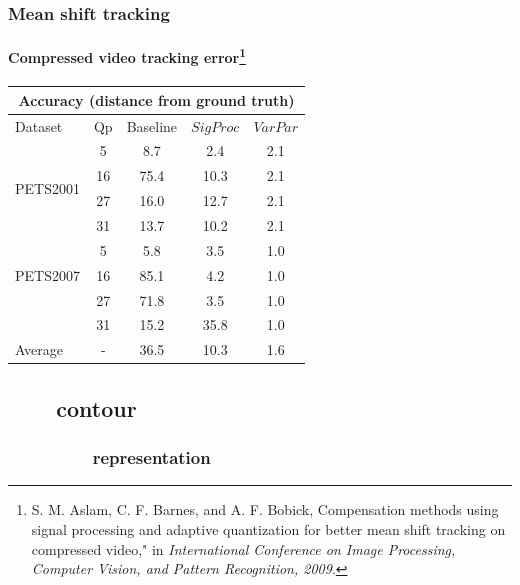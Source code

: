 \begin{frame}
\frametitle{Mean shift tracking}
\framesubtitle{Compressed video tracking error\tiny{\footnote{S. M. Aslam, C. F. Barnes, and A. F. Bobick, Compensation methods using signal processing and adaptive quantization for better mean shift tracking on compressed video," in \emph{International Conference on Image Processing, Computer Vision, and Pattern Recognition, 2009}.}}}
\logoCSIPCPL\mypagenum
	\begin{table}
		\centering
		\begin{tabular}{|l|c|c|c|c|}
			\hline
			\multicolumn{5}{|c|}{Accuracy (distance from ground truth)} \\
			\hline
			Dataset & Qp & Baseline & $SigProc$  & $VarPar$\\ 
			\hline
			\multirow{4}{*}{PETS2001} 
				&5  & 8.7 	&   2.4 &   2.1 \\
				&16 & 75.4 &  10.3 &   2.1\\
				&27 &16.0 	&  12.7 &   2.1\\
				&31 &13.7 &  10.2 &   2.1\\
			\hline
			\multirow{3}{*}{PETS2007} 
				&5 &5.8 &   3.5 &   1.0\\
				&16 &85.1 &   4.2 &   1.0\\
				&27 &71.8 &   3.5 &   1.0\\
				&31 &15.2 &  35.8 &   1.0\\
			\hline
			\multirow{1}{*}{Average}
			& - & 36.5 & 10.3 & 1.6 \\  
			\hline
		\end{tabular}
	\end{table}
\end{frame}



\subsection{\ \ \ \ contour}

\subsubsection{\ \ \ \ \ \ \ \ \   representation}

